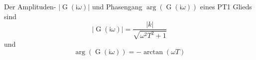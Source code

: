 Der Amplituden- $| \operatorname{G}(\mathsf{i} \omega) |$ und Phasengang $\operatorname{arg}(\operatorname{G}(\mathsf{i}\omega))$ eines PT1 Glieds sind
$$| \operatorname{G}(\mathsf{i} \omega) | = \frac{| k |}{\sqrt{\omega^{2} T^{2} + 1}}$$ 
und
$$\operatorname{arg}(\operatorname{G}(\mathsf{i} \omega)) = -\operatorname{arctan}( \omega T)$$
